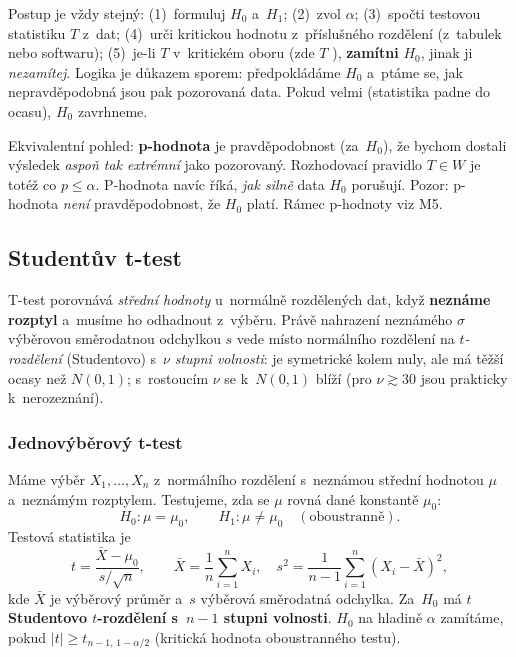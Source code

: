 \begin{intuice}
Postup je vždy stejný: (1)~formuluj $H_0$ a~$H_1$; (2)~zvol $\alpha$; (3)~spočti testovou statistiku $T$ z~dat; (4)~urči kritickou hodnotu z~příslušného rozdělení (z~tabulek nebo softwaru); (5)~je-li $T$ v~kritickém oboru (zde $T$ ), \textbf{zamítni} $H_0$, jinak ji \emph{nezamítej}. Logika je důkazem sporem: předpokládáme $H_0$ a~ptáme se, jak nepravděpodobná jsou pak pozorovaná data. Pokud velmi (statistika padne do ocasu), $H_0$ zavrhneme.
\end{intuice}

\begin{poznamka}[p-hodnota]
Ekvivalentní pohled: \textbf{p-hodnota} je pravděpodobnost (za~$H_0$), že bychom dostali výsledek \emph{aspoň tak extrémní} jako pozorovaný. Rozhodovací pravidlo $T\in W$ je totéž co $p\le\alpha$. P-hodnota navíc říká, \emph{jak silně} data $H_0$ porušují. Pozor: p-hodnota \emph{není} pravděpodobnost, že $H_0$ platí. Rámec p-hodnoty viz M5.
\end{poznamka}

\subsection{Studentův t-test}

T-test porovnává \emph{střední hodnoty} u~normálně rozdělených dat, když \textbf{neznáme rozptyl} a~musíme ho odhadnout z~výběru. Právě nahrazení neznámého $\sigma$ výběrovou směrodatnou odchylkou $s$ vede místo normálního rozdělení na \emph{$t$-rozdělení} (Studentovo) s~$\nu$ \emph{stupni volnosti}: je symetrické kolem nuly, ale má těžší ocasy než $N(0,1)$; s~rostoucím $\nu$ se k~$N(0,1)$ blíží (pro $\nu\gtrsim 30$ jsou prakticky k~nerozeznání).

\subsubsection*{Jednovýběrový t-test}

\begin{definice}
Máme výběr $X_1,\dots,X_n$ z~normálního rozdělení s~neznámou střední hodnotou $\mu$ a~neznámým rozptylem. Testujeme, zda se $\mu$ rovná dané konstantě $\mu_0$:
\[ H_0\colon \mu=\mu_0, \qquad H_1\colon \mu\neq\mu_0 \quad(\text{oboustranně}). \]
Testová statistika je
\[ t=\frac{\bar X-\mu_0}{s/\sqrt{n}}, \qquad \bar X=\frac1n\sum_{i=1}^n X_i,\quad s^2=\frac{1}{n-1}\sum_{i=1}^n (X_i-\bar X)^2, \]
kde $\bar X$ je výběrový průměr a~$s$ výběrová směrodatná odchylka. Za~$H_0$ má $t$ \textbf{Studentovo $t$-rozdělení s~$n-1$ stupni volnosti}. $H_0$ na hladině $\alpha$ zamítáme, pokud $|t|\ge t_{n-1,\,1-\alpha/2}$ (kritická hodnota oboustranného testu).
\end{definice}

